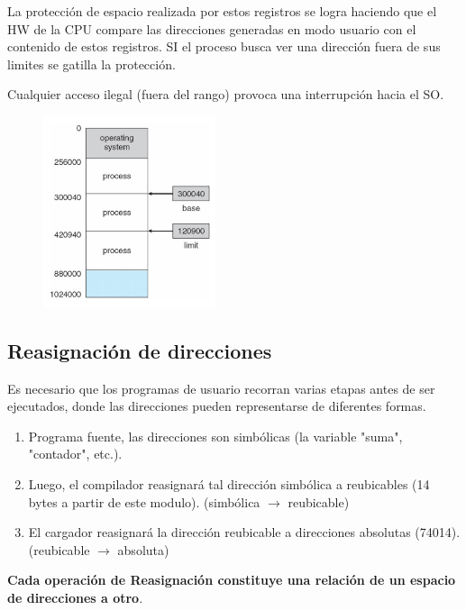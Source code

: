\documentclass{templateNote}
\begin{document}
La protección de espacio realizada por estos registros se logra haciendo que el HW de la CPU compare las direcciones generadas en modo usuario con el contenido de estos registros. SI el proceso busca ver una dirección fuera de sus limites se gatilla la protección.

Cualquier acceso ilegal (fuera del rango) provoca una interrupción hacia el SO.

\begin{figure}[H]
    \centering
    \includegraphics[width=0.45\textwidth]{img/baseylimite.png}
\end{figure}

\subsection*{Reasignación de direcciones}
Es necesario que los programas de usuario recorran varias etapas antes de ser ejecutados, donde las direcciones pueden representarse de diferentes formas.
\begin{enumerate}
    \item Programa fuente, las direcciones son simbólicas (la variable "suma", "contador", etc.).
    \item Luego, el compilador reasignará tal dirección simbólica a reubicables (14 bytes a partir de este modulo). (simbólica $\rightarrow$ reubicable)
    \item El cargador reasignará la dirección reubicable a direcciones absolutas (74014). (reubicable $\rightarrow$ absoluta)
\end{enumerate}
\textbf{Cada operación de Reasignación constituye una relación de un espacio de direcciones a otro}.
\end{document}
